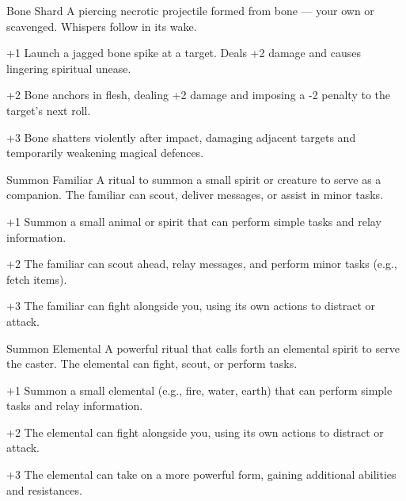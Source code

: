 \begin{WyrdSpell}[Necromancy]{Bone Shard}
    A piercing necrotic projectile formed from bone — your own or scavenged. Whispers follow in its wake.

    \begin{WyrdSpellBlock}
        \item[+1] Launch a jagged bone spike at a target. Deals +2 damage and causes lingering spiritual unease.
        \item[+2] Bone anchors in flesh, dealing +2 damage and imposing a -2 penalty to the target’s next roll.
        \item[+3] Bone shatters violently after impact, damaging adjacent targets and temporarily weakening magical defences.
    \end{WyrdSpellBlock}
\end{WyrdSpell}

\begin{WyrdSpell}[Conjuration]{Summon Familiar}
    A ritual to summon a small spirit or creature to serve as a companion. The familiar can scout, deliver messages, or assist in minor tasks.

    \begin{WyrdSpellBlock}
        \item[+1] Summon a small animal or spirit that can perform simple tasks and relay information.
        \item[+2] The familiar can scout ahead, relay messages, and perform minor tasks (e.g., fetch items).
        \item[+3] The familiar can fight alongside you, using its own actions to distract or attack.
    \end{WyrdSpellBlock}
\end{WyrdSpell}

\begin{WyrdSpell}[Conjuration]{Summon Elemental}
    A powerful ritual that calls forth an elemental spirit to serve the caster. The elemental can fight, scout, or perform tasks.

    \begin{WyrdSpellBlock}
        \item[+1] Summon a small elemental (e.g., fire, water, earth) that can perform simple tasks and relay information.
        \item[+2] The elemental can fight alongside you, using its own actions to distract or attack.
        \item[+3] The elemental can take on a more powerful form, gaining additional abilities and resistances.
    \end{WyrdSpellBlock}
\end{WyrdSpell}

